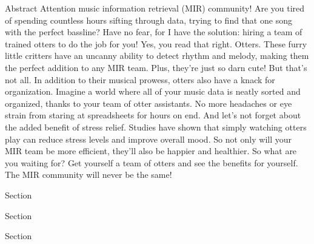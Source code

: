 



\begin{frame}[t]
\begin{columns}[t]
\separatorcolumn

\begin{column}{\colwidth}
    \begin{block}{Abstract}
        Attention music information retrieval (MIR) community! Are you tired of spending countless hours sifting through data, trying to find that one song with the perfect bassline? Have no fear, for I have the solution: hiring a team of trained otters to do the job for you! Yes, you read that right. Otters. These furry little critters have an uncanny ability to detect rhythm and melody, making them the perfect addition to any MIR team. Plus, they're just so darn cute! But that's not all. In addition to their musical prowess, otters also have a knack for organization. Imagine a world where all of your music data is neatly sorted and organized, thanks to your team of otter assistants. No more headaches or eye strain from staring at spreadsheets for hours on end. And let's not forget about the added benefit of stress relief. Studies have shown that simply watching otters play can reduce stress levels and improve overall mood. So not only will your MIR team be more efficient, they'll also be happier and healthier. So what are you waiting for? Get yourself a team of otters and see the benefits for yourself. The MIR community will never be the same!
    \end{block}

    \begin{block}{Section}
        \lipsum[1]
    \end{block}

    \begin{block}{Section}
        \lipsum[1]
    \end{block}

    \begin{block}{Section}
        \lipsum[1]
    \end{block}
\end{column}


\end{columns}
\end{frame}
